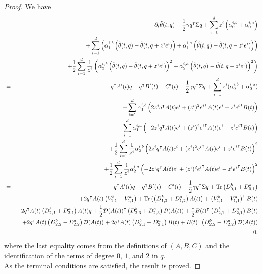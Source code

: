 \documentclass[preprint, 3p]{elsarticle}
\newcommand{\1}{{\chi}}
\begin{document}
\begin{proof}
We have
\vspace{-3mm}
\begingroup
\allowdisplaybreaks
\begin{eqnarray*}
&& \partial_t \check{\theta}(t,q) - \frac{1}{2} \gamma q^\intercal \Sigma q
\vspace{-3mm}
	+ \sum_{i=1}^d z^i\left( \alpha^{i,b}_0 + \alpha^{i,a}_0 \right)\\*
  &&+ \sum_{i=1}^d \left( \alpha^{i,b}_1 \left(\check{\theta}(t,q) - \check{\theta}(t, q + z^ie^i)\right)
                     + \alpha^{i,a}_1 \left(\check{\theta}(t,q) - \check{\theta}(t, q - z^ie^i)\right) \right) \\*
  &&+ \frac{1}{2}\sum_{i=1}^d \frac 1{z^i}\left( \alpha^{i,b}_2 \left(\check{\theta}(t,q) - \check{\theta}(t,q + z^ie^i)\right)^2
                                + \alpha^{i,a}_2 \left(\check{\theta}(t,q) - \check{\theta}(t,q - z^ie^i)\right)^2 \right)\\
 &=& -q^\intercal A'(t) q - q^\intercal B'(t) - C'(t) - \frac{1}{2} \gamma q^\intercal \Sigma q + \sum_{i=1}^d z^i( \alpha^{i,b}_0 + \alpha^{i,a}_0 )\\
\vspace{-3mm} &&+ \sum_{i=1}^d \alpha^{i,b}_1 \left(2z^i q^\intercal A(t) e^i + (z^i)^2 {e^i}^\intercal A(t) e^i + z^i {e^i}^\intercal B(t) \right)\\*
 &&+ \sum_{i=1}^d \alpha^{i,a}_1 \left(-2z^i q^\intercal A(t) e^i + (z^i)^2 {e^i}^\intercal A(t) e^i - z^i {e^i}^\intercal B(t)\right) \\*
  &&+ \frac{1}{2}\sum_{i=1}^d \frac 1{z^i} \alpha^{i,b}_2 \left(2z^i q^\intercal A(t) e^i + (z^i)^2 {e^i}^\intercal A(t) e^i + z^i {e^i}^\intercal B(t)\right)^2\\*
  &&+ \frac{1}{2}\sum_{i=1}^d \frac 1{z^i} \alpha^{i,a}_2 \left(-2z^i q^\intercal A(t) e^i + (z^i)^2 {e^i}^\intercal A(t) e^i - z^i {e^i}^\intercal B(t)\right)^2\\
  &=& -q^\intercal A'(t) q - q^\intercal B'(t) - C'(t) - \frac{1}{2} \gamma q^\intercal \Sigma q + \textrm{Tr}\left(D^b_{0,1} + D^a_{0,1}\right)\\*
 &&+ 2 q^\intercal A(t) \left(V^b_{1,1} - V^a_{1,1}\right) + \textrm{Tr}\left(\left(D^b_{1,2} + D^a_{1,2}\right) A(t)\right) + \left(V^b_{1,1} - V^a_{1,1}\right)^\intercal B(t) \\*
  &&+ 2 q^\intercal A(t) \left(D^b_{2,1} + D^a_{2,1}\right) A(t) q + \frac 12 \mathcal{D}(A(t))^\intercal \left(D^b_{2,3} + D^a_{2,3}\right) \mathcal{D}(A(t)) + \frac 12 B(t)^\intercal \left(D^b_{2,1} + D^a_{2,1}\right) B(t)\\*
  &&+2 q^\intercal A(t) \left(D^b_{2,2} - D^a_{2,2}\right) \mathcal{D}(A(t)) + 2 q^\intercal A(t) \left(D^b_{2,1} + D^a_{2,1}\right)B(t) + B(t)^\intercal \left(D^b_{2,2} - D^a_{2,2}\right) \mathcal{D}(A(t))\\
  &=&0,
\end{eqnarray*}
\endgroup
where the last equality comes from the definitions of $(A,B,C)$ and the identification of the terms of degree $0$, $1$, and $2$ in $q$.\\

As the terminal conditions are satisfied, the result is proved.
\end{proof}
\end{document}
